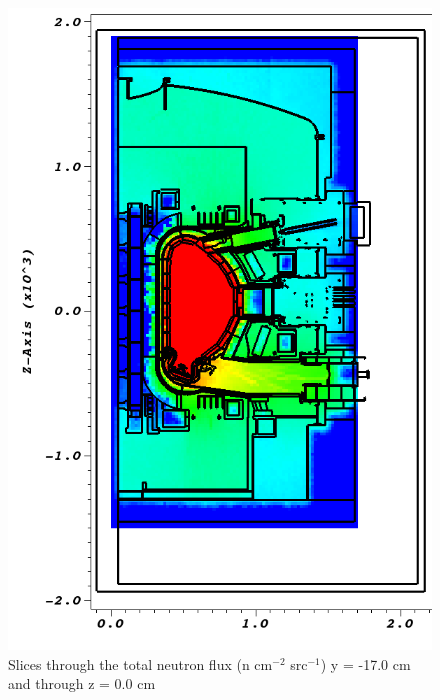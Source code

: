 \documentclass[12pt]{article}
\begin{document}
\begin{figure}[ht!]
  \includegraphics[scale=0.35]{../plots/neutron/b4c/flux_y-17.png}
  \caption{Slices through the total neutron flux (n cm$^{-2}$ src$^{-1}$) y = -17.0 cm and through z = 0.0 cm}
  \label{fig:wwinp}
\end{figure}
\end{document}

